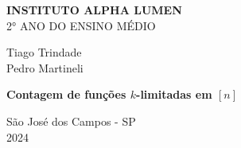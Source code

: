 \begin{center}
  \textbf{INSTITUTO ALPHA LUMEN}\\
  \vspace{0.1cm}
  2° ANO DO ENSINO MÉDIO
\end{center}
\vspace{3cm}
\begin{center}
  Tiago Trindade\\
  Pedro Martineli
\end{center}
\vspace{8cm}
\begin{center}
  \large \textbf{Contagem de funções \texorpdfstring{$k$}{k}-limitadas em \texorpdfstring{$[n]$}{[n]}}
\end{center}
\vspace{8cm}
\begin{center}
  São José dos Campos - SP\\2024
\end{center}
